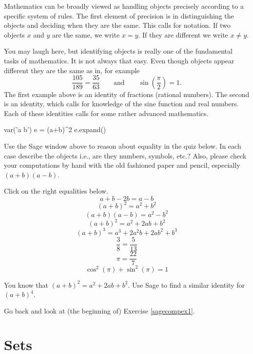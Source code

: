 \documentclass{article}
\begin{document}
Mathematics can be broadly viewed as handling objects precisely
according to a specific system of rules. The first element
of precision is in distinguishing the objects and deciding when
they are the same. This calls for notation. If two objects
$x$ and $y$ are the same, we write $x = y$. If they are different
we write $x\neq y$.

You may laugh here, but identifying objects is really one of the fundamental tasks of mathematics.
It is not always that easy. Even though objects appear different they are the same as
in, for example
$$
\frac{105}{189} = \frac{35}{63}\qquad\text{and}\qquad \sin\left(\frac{\pi}{2}\right) = 1.
$$
The first example above is an identity of fractions (rational numbers). The second is
an identity, which calls for knowledge of the sine function and real numbers. Each of these
identities calls for some rather advanced mathematics.


\beginshex\label{sagecompex1}

\begin{sage}
var('a b')
e = (a+b)^2
e.expand()
\end{sage}

Use the Sage window above to reason 
about equality in the quiz below. In each case describe the objects i.e.,
are they numbers, symbols, etc.? Also, please check your computations
by hand with the old fashioned paper and pencil, especially $(a+b)(a-b)$.

\begin{quiz}
\question
Click on the right equalities below.
$$a + b - 2 b = a - b$$
$$(a+b)^2 = a^2 + b^2$$
$$(a + b)(a - b) = a^2 - b^2$$
$$(a + b)^2 = a^2 + 2 a b +  b^2$$
$$(a+b)^3 = a^3 + 2 a^2 b + 2 a b^2 + b^3$$
$$\frac{3}{8} = \frac{5}{13}$$ 
$$
\pi = \frac{22}{7}
$$
$$
\cos^2(\pi) + \sin^2(\pi) = 1
$$
\end{quiz}
\endshex

\beginshex
You know that $(a+ b)^2 = a^2 + 2 a b + b^2$. Use Sage to find a similar identity
for $(a + b)^4$.

\begin{hint}[showhide]
  Go back and look at (the beginning of) Exercise \ref{sagecompex1}.
\end{hint}
\endshex



\section{Sets}
\end{document}
